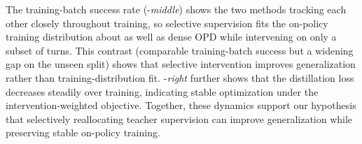 The training-batch success rate (-\textit{middle}) shows the two methods tracking each other closely throughout training, so selective supervision fits the on-policy training distribution about as well as dense OPD while intervening on only a subset of turns.
%
This contrast (comparable training-batch success but a widening gap on the unseen split) shows that selective intervention improves generalization rather than training-distribution fit.
%
-\textit{right} further shows that the \ours distillation loss decreases steadily over training, indicating stable optimization under the intervention-weighted objective. 
%
Together, these dynamics support our hypothesis that selectively reallocating teacher supervision can improve generalization while preserving stable on-policy training.